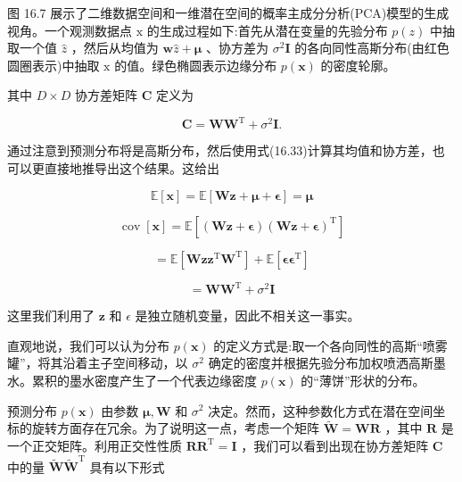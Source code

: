 \documentclass[10pt]{report}
\begin{document}
图 16.7 展示了二维数据空间和一维潜在空间的概率主成分分析(PCA)模型的生成视角。一个观测数据点 \(\mathrm{x}\) 的生成过程如下:首先从潜在变量的先验分布 \(p\left( z\right)\) 中抽取一个值 \(\widehat{z}\) ，然后从均值为 \(\mathbf{w}\widehat{z} + \mathbf{\mu }\) 、协方差为 \({\sigma }^{2}\mathbf{I}\) 的各向同性高斯分布(由红色圆圈表示)中抽取 \(\mathrm{x}\) 的值。绿色椭圆表示边缘分布 \(p\left( \mathbf{x}\right)\) 的密度轮廓。

其中 \(D \times  D\) 协方差矩阵 \(\mathbf{C}\) 定义为

\[
\mathbf{C} = \mathbf{W}{\mathbf{W}}^{\mathrm{T}} + {\sigma }^{2}\mathbf{I}. \tag{16.36}
\]

通过注意到预测分布将是高斯分布，然后使用式(16.33)计算其均值和协方差，也可以更直接地推导出这个结果。这给出

\[
\mathbb{E}\left\lbrack  \mathbf{x}\right\rbrack   = \mathbb{E}\left\lbrack  {\mathbf{W}\mathbf{z} + \mathbf{\mu } + \mathbf{\epsilon }}\right\rbrack   = \mathbf{\mu } \tag{16.37}
\]

\[
\operatorname{cov}\left\lbrack  \mathbf{x}\right\rbrack   = \mathbb{E}\left\lbrack  {\left( {\mathbf{W}\mathbf{z} + \mathbf{\epsilon }}\right) {\left( \mathbf{W}\mathbf{z} + \mathbf{\epsilon }\right) }^{\mathrm{T}}}\right\rbrack
\]

\[
= \mathbb{E}\left\lbrack  {\mathbf{W}\mathbf{z}{\mathbf{z}}^{\mathrm{T}}{\mathbf{W}}^{\mathrm{T}}}\right\rbrack   + \mathbb{E}\left\lbrack  {\mathbf{\epsilon }{\mathbf{\epsilon }}^{\mathrm{T}}}\right\rbrack   \tag{16.38}
\]

\[
= \mathbf{W}{\mathbf{W}}^{\mathrm{T}} + {\sigma }^{2}\mathbf{I} \tag{16.39}
\]

这里我们利用了 \(\mathbf{z}\) 和 \(\epsilon\) 是独立随机变量，因此不相关这一事实。

直观地说，我们可以认为分布 \(p\left( \mathbf{x}\right)\) 的定义方式是:取一个各向同性的高斯“喷雾罐”，将其沿着主子空间移动，以 \({\sigma }^{2}\) 确定的密度并根据先验分布加权喷洒高斯墨水。累积的墨水密度产生了一个代表边缘密度 \(p\left( \mathbf{x}\right)\) 的“薄饼”形状的分布。

预测分布 \(p\left( \mathbf{x}\right)\) 由参数 \(\mathbf{\mu },\mathbf{W}\) 和 \({\sigma }^{2}\) 决定。然而，这种参数化方式在潜在空间坐标的旋转方面存在冗余。为了说明这一点，考虑一个矩阵 \(\widetilde{\mathbf{W}} = \mathbf{{WR}}\) ，其中 \(\mathbf{R}\) 是一个正交矩阵。利用正交性性质 \(\mathbf{R}{\mathbf{R}}^{\mathrm{T}} = \mathbf{I}\) ，我们可以看到出现在协方差矩阵 \(\mathbf{C}\) 中的量 \(\widetilde{\mathbf{W}}{\widetilde{\mathbf{W}}}^{\mathrm{T}}\) 具有以下形式
\end{document}
